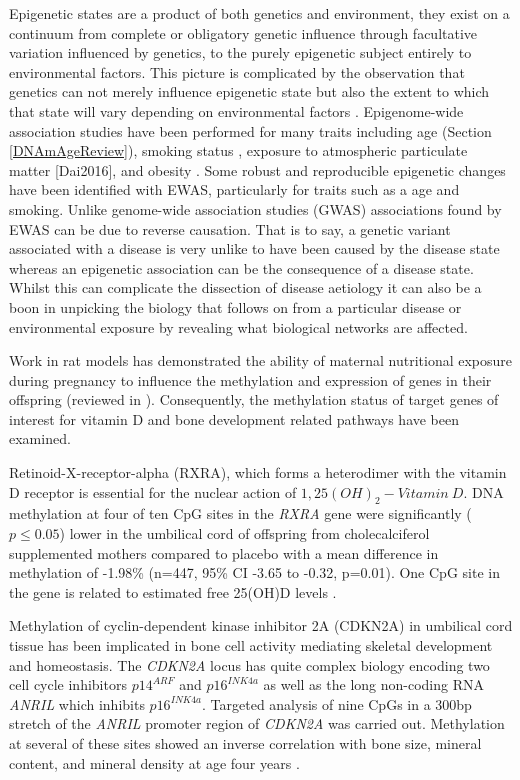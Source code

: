 \documentclass[]{book}
\begin{document}
Epigenetic states are a product of both genetics and environment, they exist on a continuum from complete or obligatory genetic influence through facultative variation influenced by genetics, to the purely epigenetic subject entirely to environmental factors. This picture is complicated by the observation that genetics can not merely influence epigenetic state but also the extent to which that state will vary depending on environmental factors \citep{Holland2017}. Epigenome-wide association studies have been performed for many traits including age (Section \ref{DNAmAgeReview}), smoking status \citep{Dogan2017}, exposure to atmospheric particulate matter {[}Dai2016{]}, and obesity \citep{Wahl2016}. Some robust and reproducible epigenetic changes have been identified with EWAS, particularly for traits such as a age and smoking. Unlike genome-wide association studies (GWAS) associations found by EWAS can be due to reverse causation. That is to say, a genetic variant associated with a disease is very unlike to have been caused by the disease state whereas an epigenetic association can be the consequence of a disease state. Whilst this can complicate the dissection of disease aetiology it can also be a boon in unpicking the biology that follows on from a particular disease or environmental exposure by revealing what biological networks are affected.

Work in rat models has demonstrated the ability of maternal nutritional exposure during pregnancy to influence the methylation and expression of genes in their offspring \citep[\citet{Lillycrop2008}]{Burdge2007a} (reviewed in \citep{Burdge2007}). Consequently, the methylation status of target genes of interest for vitamin D and bone development related pathways have been examined.

Retinoid-X-receptor-alpha (RXRA), which forms a heterodimer with the vitamin D receptor is essential for the nuclear action of \(1,25(OH)_2-Vitamin~D\). DNA methylation at four of ten CpG sites in the \emph{RXRA} gene were significantly (\(p\le0.05\)) lower in the umbilical cord of offspring from cholecalciferol supplemented mothers compared to placebo with a mean difference in methylation of -1.98\% (n=447, 95\% CI -3.65 to -0.32, p=0.01). One CpG site in the gene is related to estimated free 25(OH)D levels \citep{Harvey2014d}.

Methylation of cyclin-dependent kinase inhibitor 2A (CDKN2A) in umbilical cord tissue has been implicated in bone cell activity mediating skeletal development and homeostasis. The \emph{CDKN2A} locus has quite complex biology encoding two cell cycle inhibitors \(p14^{ARF}\) and \(p16^{INK4a}\) as well as the long non-coding RNA \emph{ANRIL} which inhibits \(p16^{INK4a}\). Targeted analysis of nine CpGs in a 300bp stretch of the \emph{ANRIL} promoter region of \emph{CDKN2A} was carried out. Methylation at several of these sites showed an inverse correlation with bone size, mineral content, and mineral density at age four years \citep{Curtis2017}.
\end{document}
